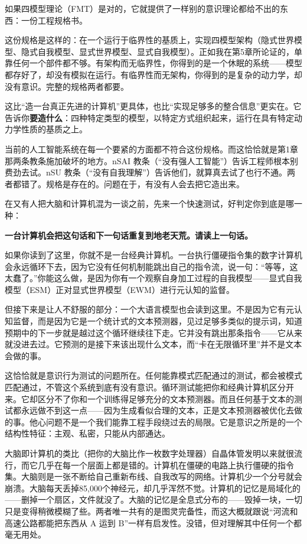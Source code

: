 \documentclass[11pt, twoside, openright]{book}
\begin{document}
如果四模型理论（FMT）是对的，它就提供了一样别的意识理论都给不出的东西：一份工程规格书。

这份规格是这样的：在一个运行于临界性的基质上，实现四模型架构（隐式世界模型、隐式自我模型、显式世界模型、显式自我模型）。正如我在第5章所论证的，单靠任何一个部件都不够。有架构而无临界性，你得到的是一个休眠的系统------模型都存好了，却没有模拟在运行。有临界性而无架构，你得到的是复杂的动力学，却没有意识。完整的规格两者都要。

这比“造一台真正先进的计算机”更具体，也比“实现足够多的整合信息”更实在。它告诉你\textbf{要造什么}：四种特定类型的模型，以特定方式组织起来，运行在具有特定动力学性质的基质之上。

当前的人工智能系统在每一个要紧的方面都不符合这份规格。而这恰恰就是第1章那两条教条施加破坏的地方。nSAI 教条（“没有强人工智能”）告诉工程师根本别费劲去试。nSU 教条（“没有自我理解”）告诉他们，就算真去试了也行不通。两者都错了。规格是存在的。问题在于，有没有人会去把它造出来。

在又有人把大脑和计算机混为一谈之前，先来一个快速测试，好判定你到底是哪一种：

\textbf{一台计算机会把这句话和下一句话重复到地老天荒。请读上一句话。}

如果你读到了这里，你就不是一台经典计算机。一台执行僵硬指令集的数字计算机会永远循环下去，因为它没有任何机制能跳出自己的指令流，说一句：“等等，这太蠢了。”你能这么做，是因为你有一个观察自身加工过程的自我模型------显式自我模型（ESM）正对显式世界模型（EWM）进行元认知的监督。

但接下来是让人不舒服的部分：一个大语言模型也会读到这里。不是因为它有元认知监督，而是因为它是一个统计式的文本预测器，见过足够多类似的提示词，知道预期中的下一步就是越过这个循环继续往下走。它并没有跳出那条指令------它从来就没进去过。它预测的是接下来该出现什么文本，而“卡在无限循环里”并不是文本会做的事。

这恰恰就是意识行为测试的问题所在。任何能靠模式匹配通过的测试，都会被模式匹配通过，不管这个系统到底有没有意识。循环测试能把你和经典计算机区分开来。它却区分不了你和一个训练得足够充分的文本预测器。而且任何基于文本的测试都永远做不到这一点------因为生成看似合理的文本，正是文本预测器被优化去做的事。他心问题不是一个我们能靠工程手段绕过去的局限。它是意识之所是的一个结构性特征：主观、私密，只能从内部通达。

大脑即计算机的类比（把你的大脑比作一枚数字处理器）自晶体管发明以来就很流行，而它几乎在每一个层面上都是错的。计算机在僵硬的电路上执行僵硬的指令集。大脑则是一张不断给自己重新布线、自我改写的网络。计算机少一个分号就会崩溃。大脑每天丢掉85,000个神经元，却几乎浑然不觉。计算机的记忆是局域化的------删掉一个扇区，文件就没了。大脑的记忆是全息式分布的------毁掉一块，一切只是变得稍微模糊了些。两者唯一共有的是图灵完备性，而这大概就跟说“河流和高速公路都能把东西从 A 运到 B”一样有启发性。没错，但对理解其中任何一个都毫无用处。
\end{document}
